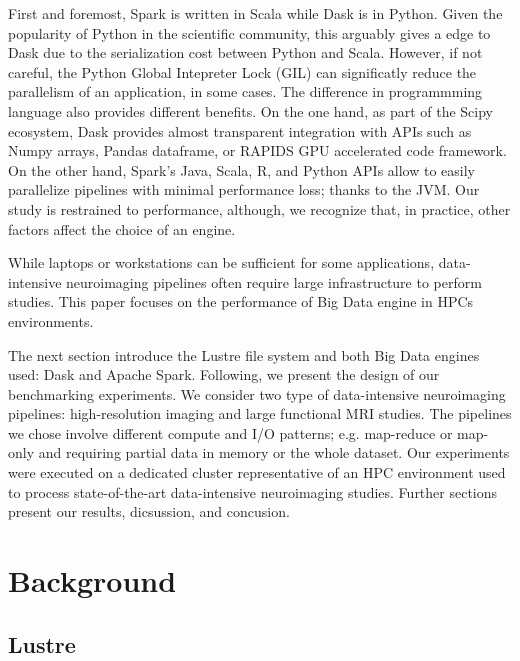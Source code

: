 \documentclass[conference]{IEEEtran}
\begin{document}
First and foremost, Spark is written in Scala while Dask is in Python.
Given the popularity of Python in the scientific community, this arguably gives a edge to Dask due to the serialization cost between Python and Scala.
However, if not careful, the Python Global Intepreter Lock (GIL) can significatly reduce the parallelism of an application, in some cases.
The difference in programmming language also provides different benefits.
On the one hand, as part of the Scipy ecosystem, Dask provides almost transparent integration with APIs such as Numpy arrays, Pandas dataframe, or RAPIDS GPU accelerated code framework.
On the other hand, Spark's Java, Scala, R, and Python APIs allow to easily parallelize pipelines with minimal performance loss; thanks to the JVM.
Our study is restrained to performance, although, we recognize that, in practice, other factors affect the choice of an engine.

While laptops or workstations can be sufficient for some applications, data-intensive neuroimaging pipelines often require large infrastructure to perform studies.
This paper focuses on the performance of Big Data engine in HPCs environments.


The next section introduce the Lustre file system and both Big Data engines used: Dask and Apache Spark.
Following, we present the design of our benchmarking experiments.
We consider two type of data-intensive neuroimaging pipelines: high-resolution imaging and large functional MRI studies.
The pipelines we chose involve different compute and I/O patterns; e.g. map-reduce or map-only and requiring partial data in memory or the whole dataset.
Our experiments were executed on a dedicated cluster representative of an HPC environment used to process state-of-the-art data-intensive neuroimaging studies.
Further sections present our results, dicsussion, and concusion.


\section{Background}
\subsection{Lustre}
\end{document}
